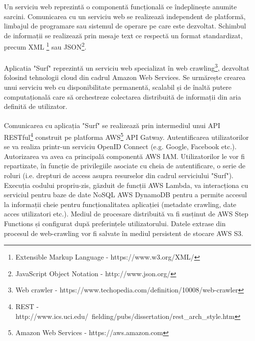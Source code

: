 \newcommand{\xmlDescription}{Extensible Markup Language - https://www.w3.org/XML/}
\newcommand{\jsonDescription}{JavaScript Object Notation - http://www.json.org/}
\newcommand{\crawlDescription}{Web crawler - https://www.techopedia.com/definition/10008/web-crawler}
\newcommand{\restDescription}{REST - http://www.ics.uci.edu/~fielding/pubs/dissertation/rest\_arch\_style.htm}
\newcommand{\awsDescription}{Amazon Web Services - https://aws.amazon.com}

Un serviciu web reprezintă o componentă funcțională ce îndeplinește anumite sarcini. Comunicarea cu un serviciu web se realizează independent de platformă, limbajul de programare sau sistemul de operare pe care este dezvoltat. Schimbul de informații se realizează prin mesaje text ce respectă un format standardizat, precum XML \footnote{\xmlDescription} sau JSON\footnote{\jsonDescription}. 
\\
\\
Aplicatia "Surf" reprezintă un serviciu web specializat în web crawling\footnote{\crawlDescription}, dezvoltat folosind tehnologii cloud din cadrul Amazon Web Services. Se urmărește crearea unui serviciu web cu disponibilitate permanentă, scalabil și de înaltă putere computațională care să orchestreze colectarea distribuită de informații din aria definită de utilizator.
\\
\\
Comunicarea cu aplicația "Surf" se realizează prin intermediul unui API RESTful\footnote{\restDescription} construit pe platforma AWS\footnote{\awsDescription} API Gatway. Autentificarea utilizatorilor se va realiza printr-un serviciu OpenID Connect (e.g. Google, Facebook etc.). Autorizarea va avea ca principală componentă AWS IAM. Utilizatorilor le vor fi repartizate, în funcție de privilegiile asociate cu cheia de autentificare, o serie de roluri (i.e. drepturi de access asupra resurselor din cadrul serviciului "Surf"). Execuția codului propriu-zis, găzduit de funcții AWS Lambda, va interacționa cu serviciul pentru baze de date NoSQL AWS DynamoDB pentru a permite accesul la informații cheie pentru funcționalitatea aplicației (metadate crawling, date acces utilizatori etc.). Mediul de procesare distribuită va fi susținut de AWS Step Functions și configurat după preferințele utilizatorului. Datele extrase din procesul de web-crawling vor fi salvate în mediul persistent de stocare AWS S3.
